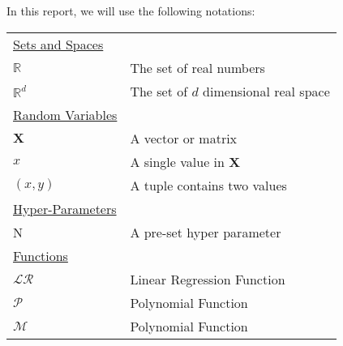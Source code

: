 In this report, we will use the following notations:

\begin{table}[h]
\begin{tabularx}{\textwidth}{@{}XX@{}}
\toprule
  \underline{Sets and Spaces} \\
  $\mathbb{R}$ & The set of real numbers \\
  $\mathbb{R}^d$ & The set of $d$ dimensional real space \\
  \underline{Random Variables} \\
  $\textbf{X}$ & A vector or matrix \\
  $x$ & A single value in $\textbf{X}$ \\
  $(x,y)$ & A tuple contains two values \\	
  \underline{Hyper-Parameters} \\
  N   & A pre-set hyper parameter \\
  \underline{Functions} \\
  $\mathcal{LR}$ & Linear Regression Function\\
  $\mathcal{P}$ & Polynomial Function\\
  $\mathcal{M}$ & Polynomial Function\\
\bottomrule
\end{tabularx}
\end{table}
